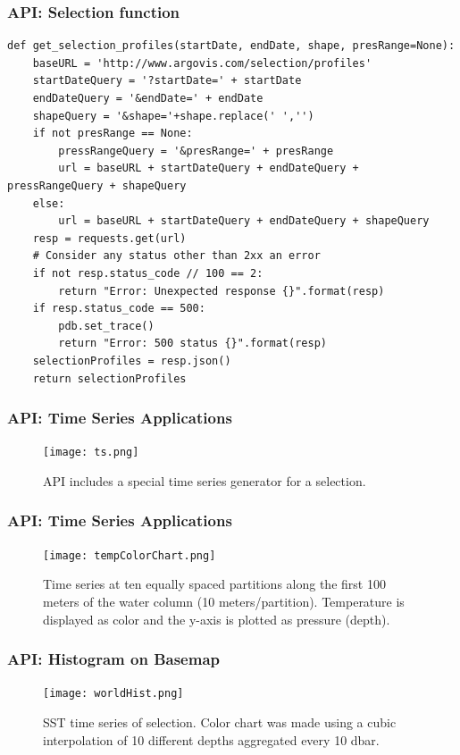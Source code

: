 \begin{frame}[fragile]
\frametitle{API: Selection function}
\begin{lstlisting}[basicstyle=\tiny, caption=Python function to retrieve selection data]
def get_selection_profiles(startDate, endDate, shape, presRange=None):
    baseURL = 'http://www.argovis.com/selection/profiles'
    startDateQuery = '?startDate=' + startDate
    endDateQuery = '&endDate=' + endDate
    shapeQuery = '&shape='+shape.replace(' ','')
    if not presRange == None:
        pressRangeQuery = '&presRange=' + presRange
        url = baseURL + startDateQuery + endDateQuery + pressRangeQuery + shapeQuery
    else:
        url = baseURL + startDateQuery + endDateQuery + shapeQuery
    resp = requests.get(url)
    # Consider any status other than 2xx an error
    if not resp.status_code // 100 == 2:
        return "Error: Unexpected response {}".format(resp)
    if resp.status_code == 500:
        pdb.set_trace()
        return "Error: 500 status {}".format(resp)
    selectionProfiles = resp.json()
    return selectionProfiles
\end{lstlisting}
\end{frame}


\begin{frame}
\frametitle{API: Time Series Applications}
\begin{figure}
\centering
\begin{minipage}{.8\columnwidth}
\texttt{[image: ts.png]}
\caption{API includes a special time series generator for a selection.}
\end{minipage}
\end{figure}
\end{frame}

\begin{frame}
\frametitle{API: Time Series Applications}
\begin{figure}
\centering
\begin{minipage}{.65\columnwidth}
\texttt{[image: tempColorChart.png]}
\caption{Time series at ten equally spaced partitions along the first 100 meters of the water column (10 meters/partition). Temperature is displayed as color and the y-axis is plotted as pressure (depth).}
\end{minipage}
\end{figure}
\end{frame}

\begin{frame}
\frametitle{API: Histogram on Basemap}
\begin{figure}
\centering
\begin{minipage}{1\columnwidth}
\texttt{[image: worldHist.png]}
\caption{SST time series of selection. Color chart was made using a cubic interpolation of 10 different depths aggregated every 10 dbar.}
\end{minipage}
\end{figure}
\end{frame}

